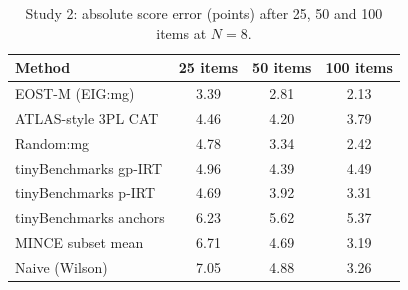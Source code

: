 \begin{table}[htbp]
\centering\footnotesize
\caption{Study 2: absolute score error (points) after 25, 50 and 100 items at $N=8$.}
\label{tab:reduction}
\begin{tabular}{@{}lccc@{}}
\toprule
Method & 25 items & 50 items & 100 items \\
\midrule
EOST-M (EIG:mg) & 3.39 & 2.81 & 2.13 \\
ATLAS-style 3PL CAT & 4.46 & 4.20 & 3.79 \\
Random:mg & 4.78 & 3.34 & 2.42 \\
tinyBenchmarks gp-IRT & 4.96 & 4.39 & 4.49 \\
tinyBenchmarks p-IRT & 4.69 & 3.92 & 3.31 \\
tinyBenchmarks anchors & 6.23 & 5.62 & 5.37 \\
MINCE subset mean & 6.71 & 4.69 & 3.19 \\
Naive (Wilson) & 7.05 & 4.88 & 3.26 \\
\bottomrule
\end{tabular}
\end{table}
